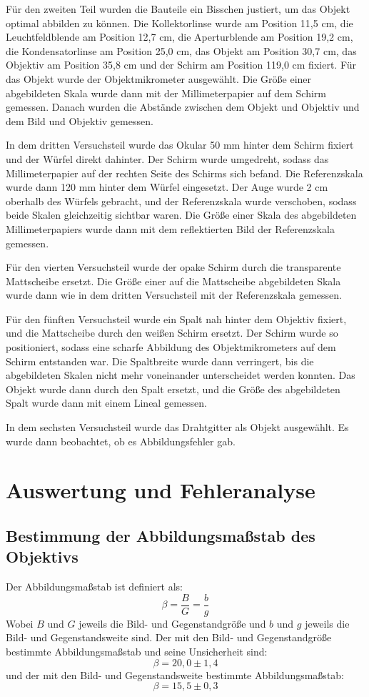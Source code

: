 \documentclass[11pt,a4paper]{article}
\begin{document}
Für den zweiten Teil wurden die Bauteile ein Bisschen justiert, um das Objekt optimal abbilden zu können. Die Kollektorlinse wurde am Position 11,5 cm, die Leuchtfeldblende am Position 12,7 cm, die Aperturblende am Position 19,2 cm, die Kondensatorlinse am Position 25,0 cm, das Objekt am Position 30,7 cm, das Objektiv am Position 35,8 cm und der Schirm am Position 119,0 cm fixiert. Für das Objekt wurde der Objektmikrometer ausgewählt. Die Größe einer abgebildeten Skala wurde dann mit der Millimeterpapier auf dem Schirm gemessen. Danach wurden die Abstände zwischen dem Objekt und Objektiv und dem Bild und Objektiv gemessen. 

In dem dritten Versuchsteil wurde das Okular 50 mm hinter dem Schirm fixiert und der Würfel direkt dahinter. Der Schirm wurde umgedreht, sodass das Millimeterpapier auf der rechten Seite des Schirms sich befand. Die Referenzskala wurde dann 120 mm hinter dem Würfel eingesetzt. Der Auge wurde 2 cm oberhalb des Würfels gebracht, und der Referenzskala wurde verschoben, sodass beide Skalen gleichzeitig sichtbar waren. Die Größe einer Skala des abgebildeten Millimeterpapiers wurde dann mit dem reflektierten Bild der Referenzskala gemessen. 

Für den vierten Versuchsteil wurde der opake Schirm durch die transparente Mattscheibe ersetzt. Die Größe einer auf die Mattscheibe abgebildeten Skala wurde dann wie in dem dritten Versuchsteil mit der Referenzskala gemessen. 

Für den fünften Versuchsteil wurde ein Spalt nah hinter dem Objektiv fixiert, und die Mattscheibe durch den weißen Schirm ersetzt. Der Schirm wurde so positioniert, sodass eine scharfe Abbildung des Objektmikrometers auf dem Schirm entstanden war. Die Spaltbreite wurde dann verringert, bis die abgebildeten Skalen nicht mehr voneinander unterscheidet werden konnten. Das Objekt wurde dann durch den Spalt ersetzt, und die Größe des abgebildeten Spalt wurde dann mit einem Lineal gemessen. 

In dem sechsten Versuchsteil wurde das Drahtgitter als Objekt ausgewählt. Es wurde dann beobachtet, ob es Abbildungsfehler gab. 


\section{Auswertung und Fehleranalyse}
\subsection{Bestimmung der Abbildungsmaßstab des Objektivs}
Der Abbildungsmaßstab ist definiert als:
$$ \beta = \frac{B}{G} = \frac{b}{g} $$
Wobei $B$ und $G$ jeweils die Bild- und Gegenstandgröße und $b$ und $g$ jeweils die Bild- und Gegenstandsweite sind. Der mit den Bild- und Gegenstandgröße bestimmte Abbildungsmaßstab und seine Unsicherheit sind:
$$ \beta = 20,0 \pm 1,4 $$
und der mit den Bild- und Gegenstandsweite bestimmte Abbildungsmaßstab:
$$ \beta = 15,5 \pm 0,3 $$
\end{document}
